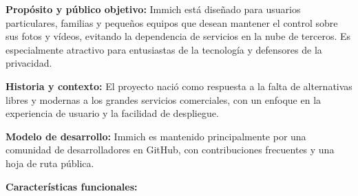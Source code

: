 \textbf{Propósito y público objetivo:} Immich está diseñado para usuarios particulares, familias y pequeños equipos que desean mantener el control sobre sus fotos y vídeos, evitando la dependencia de servicios en la nube de terceros. Es especialmente atractivo para entusiastas de la tecnología y defensores de la privacidad.

\textbf{Historia y contexto:} El proyecto nació como respuesta a la falta de alternativas libres y modernas a los grandes servicios comerciales, con un enfoque en la experiencia de usuario y la facilidad de despliegue.

\textbf{Modelo de desarrollo:} Immich es mantenido principalmente por una comunidad de desarrolladores en GitHub, con contribuciones frecuentes y una hoja de ruta pública.

\textbf{Características funcionales:}

